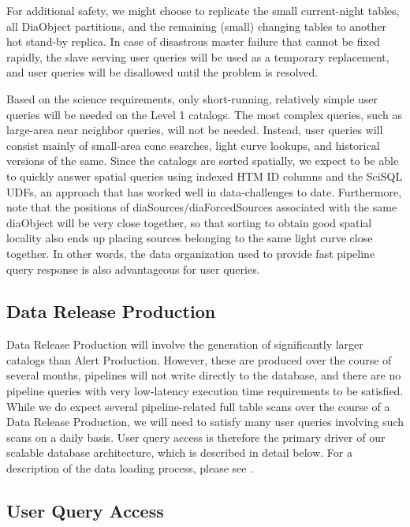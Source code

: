 \documentclass[DM,lsstdraft,toc]{lsstdoc}
\begin{document}
For additional safety, we might choose to replicate the small
current-night tables, all DiaObject partitions, and the remaining
(small) changing tables to another hot stand-by replica. In case of
disastrous master failure that cannot be fixed rapidly, the slave
serving user queries will be used as a temporary replacement, and user
queries will be disallowed until the problem is resolved.

Based on the science requirements, only short-running, relatively simple
user queries will be needed on the Level 1 catalogs. The most complex
queries, such as large-area near neighbor queries, will not be needed.
Instead, user queries will consist mainly of small-area cone searches,
light curve lookups, and historical versions of the same. Since the
catalogs are sorted spatially, we expect to be able to quickly answer
spatial queries using indexed HTM ID columns and the SciSQL UDFs, an
approach that has worked well in data-challenges to date. Furthermore,
note that the positions of diaSources/diaForcedSources associated with
the same diaObject will be very close together, so that sorting to
obtain good spatial locality also ends up placing sources belonging to
the same light curve close together. In other words, the data
organization used to provide fast pipeline query response is also
advantageous for user queries.

\subsection{Data Release Production}\label{data-release-production}

Data Release Production will involve the generation of significantly
larger catalogs than Alert Production. However, these are produced over
the course of several months, pipelines will not write directly to the
database, and there are no pipeline queries with very low-latency
execution time requirements to be satisfied. While we do expect several
pipeline-related full table scans over the course of a Data Release
Production, we will need to satisfy many user queries involving such
scans on a daily basis. User query access is therefore the primary
driver of our scalable database architecture, which is described in
detail below. For a description of the data loading process, please see
.

\subsection{User Query Access}\label{user-query-access}
\end{document}
